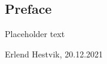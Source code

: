 \newpage
\begin{centering}
\section*{Preface}
\end{centering}
Placeholder text

\begin{center}
    Erlend Hestvik, 20.12.2021
\end{center}

\afterpage{\blankpage}